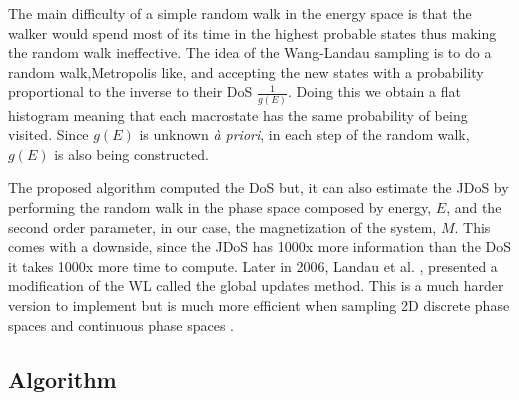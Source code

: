 The main difficulty of a simple random walk in the energy space is that the walker would spend most of its time in the highest probable states thus making the random walk ineffective. The idea of the Wang-Landau sampling is to do a random walk,Metropolis like, and accepting the new states with a probability proportional to the inverse to their DoS $\frac{1}{g(E)}$. Doing this we obtain a flat histogram meaning that each macrostate has the same probability of being visited.  
Since $g(E)$ is unknown \textit{à priori}, in each step of the random walk, $g(E)$ is also being constructed.

The proposed algorithm computed the DoS but, it can also estimate the JDoS by performing the random walk in the phase space composed by energy, $E$, and the second order parameter, in our case, the magnetization of the system, $M$. This comes with a downside, since the JDoS has 1000x more information than the DoS it takes 1000x more time to compute.
Later in 2006, Landau et al. \cite{WL_Cont}, presented a modification of the WL called the global updates method. This is a much harder version to implement but is much more efficient when sampling 2D discrete phase spaces and continuous phase spaces \cite{Poulain2006}.  

\subsection{Algorithm}

